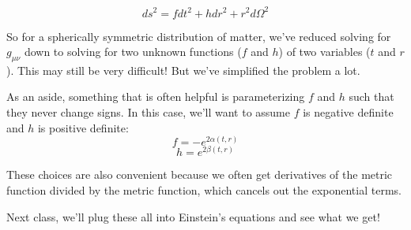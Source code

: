 \documentclass[11pt,table]{article}
\begin{document}
\begin{equation}\label{eq:finalmetric}
  ds^2 = fdt^2 + hdr^2 + r^2d\Omega^2
\end{equation}

So for a spherically symmetric distribution of matter, we've reduced solving for $g_{\mu\nu}$ down to solving for two unknown functions ($f$ and $h$) of two variables ($t$ and $r$). This may still be very difficult! But we've simplified the problem a lot.

As an aside, something that is often helpful is parameterizing $f$ and $h$ such that they never change signs. In this case, we'll want to assume $f$ is negative definite and $h$ is positive definite:
\begin{equation}\label{eq:f}
  f = -e^{2\alpha(t,r)}
\end{equation}
\begin{equation}\label{eq:h}
  h = e^{2\beta(t,r)}
\end{equation}

These choices are also convenient because we often get derivatives of the metric function divided by the metric function, which cancels out the exponential terms.

Next class, we'll plug these all into Einstein's equations and see what we get!
\end{document}
